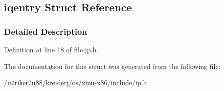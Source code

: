 \hypertarget{structiqentry}{}\subsection{iqentry Struct Reference}
\label{structiqentry}


\subsubsection{Detailed Description}


Definition at line 18 of file ip.\+h.



The documentation for this struct was generated from the following file\+:\begin{DoxyCompactItemize}
\item 
/u/riker/u88/kreiderj/os/xinu-\/x86/include/ip.\+h\end{DoxyCompactItemize}
